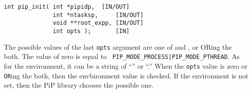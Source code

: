 \begin{lstlisting}[frame=tRBl]
int pip_init( int *pipidp,	[IN/OUT]
              int *ntasksp,     [IN/OUT]
              void **root_expp, [IN/OUT]
              int opts );       [IN]
\end{lstlisting}

The possible values of the last {\tt opts} argument are one of 
 and , or ORing
the both. The value of zero is equal to {\tt
  PIP_MODE_PROCESS|PIP_MODE_PTHREAD}. As for the 
environment, it can be a string of ``'' or
``.''
When the {\tt opts} value is zero or {\tt OR}ing the both, then the
 envbironment value is checked. If the environment
is not set, then the PiP library chooses the possible one.

